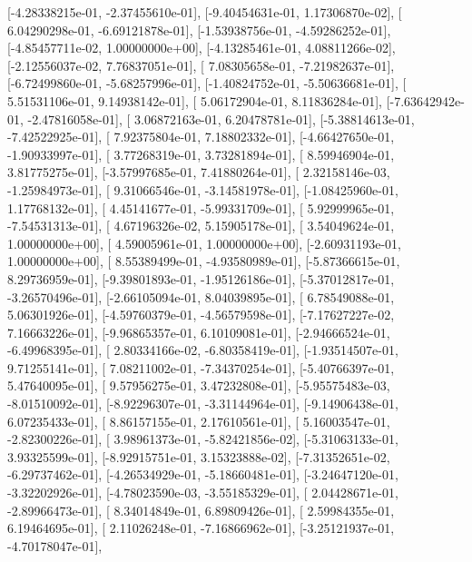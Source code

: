 \documentclass{article}
\begin{document}
       [-4.28338215e-01, -2.37455610e-01],
       [-9.40454631e-01,  1.17306870e-02],
       [ 6.04290298e-01, -6.69121878e-01],
       [-1.53938756e-01, -4.59286252e-01],
       [-4.85457711e-02,  1.00000000e+00],
       [-4.13285461e-01,  4.08811266e-02],
       [-2.12556037e-02,  7.76837051e-01],
       [ 7.08305658e-01, -7.21982637e-01],
       [-6.72499860e-01, -5.68257996e-01],
       [-1.40824752e-01, -5.50636681e-01],
       [ 5.51531106e-01,  9.14938142e-01],
       [ 5.06172904e-01,  8.11836284e-01],
       [-7.63642942e-01, -2.47816058e-01],
       [ 3.06872163e-01,  6.20478781e-01],
       [-5.38814613e-01, -7.42522925e-01],
       [ 7.92375804e-01,  7.18802332e-01],
       [-4.66427650e-01, -1.90933997e-01],
       [ 3.77268319e-01,  3.73281894e-01],
       [ 8.59946904e-01,  3.81775275e-01],
       [-3.57997685e-01,  7.41880264e-01],
       [ 2.32158146e-03, -1.25984973e-01],
       [ 9.31066546e-01, -3.14581978e-01],
       [-1.08425960e-01,  1.17768132e-01],
       [ 4.45141677e-01, -5.99331709e-01],
       [ 5.92999965e-01, -7.54531313e-01],
       [ 4.67196326e-02,  5.15905178e-01],
       [ 3.54049624e-01,  1.00000000e+00],
       [ 4.59005961e-01,  1.00000000e+00],
       [-2.60931193e-01,  1.00000000e+00],
       [ 8.55389499e-01, -4.93580989e-01],
       [-5.87366615e-01,  8.29736959e-01],
       [-9.39801893e-01, -1.95126186e-01],
       [-5.37012817e-01, -3.26570496e-01],
       [-2.66105094e-01,  8.04039895e-01],
       [ 6.78549088e-01,  5.06301926e-01],
       [-4.59760379e-01, -4.56579598e-01],
       [-7.17627227e-02,  7.16663226e-01],
       [-9.96865357e-01,  6.10109081e-01],
       [-2.94666524e-01, -6.49968395e-01],
       [ 2.80334166e-02, -6.80358419e-01],
       [-1.93514507e-01,  9.71255141e-01],
       [ 7.08211002e-01, -7.34370254e-01],
       [-5.40766397e-01,  5.47640095e-01],
       [ 9.57956275e-01,  3.47232808e-01],
       [-5.95575483e-03, -8.01510092e-01],
       [-8.92296307e-01, -3.31144964e-01],
       [-9.14906438e-01,  6.07235433e-01],
       [ 8.86157155e-01,  2.17610561e-01],
       [ 5.16003547e-01, -2.82300226e-01],
       [ 3.98961373e-01, -5.82421856e-02],
       [-5.31063133e-01,  3.93325599e-01],
       [-8.92915751e-01,  3.15323888e-02],
       [-7.31352651e-02, -6.29737462e-01],
       [-4.26534929e-01, -5.18660481e-01],
       [-3.24647120e-01, -3.32202926e-01],
       [-4.78023590e-03, -3.55185329e-01],
       [ 2.04428671e-01, -2.89966473e-01],
       [ 8.34014849e-01,  6.89809426e-01],
       [ 2.59984355e-01,  6.19464695e-01],
       [ 2.11026248e-01, -7.16866962e-01],
       [-3.25121937e-01, -4.70178047e-01],
\end{document}
